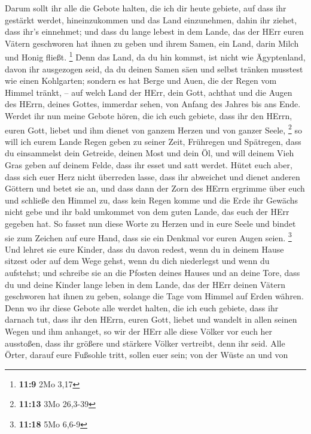  Darum sollt ihr alle die Gebote halten, die ich dir heute
gebiete, auf dass ihr gestärkt werdet, hineinzukommen und das Land
einzunehmen, dahin ihr ziehet, dass ihr's einnehmet;  und
dass du lange lebest in dem Lande, das der HErr euren Vätern geschworen
hat ihnen zu geben und ihrem Samen, ein Land, darin Milch und Honig
fließt. \footnote{\textbf{11:9} 2Mo 3,17}  Denn das Land,
da du hin kommst, ist nicht wie Ägyptenland, davon ihr ausgezogen seid,
da du deinen Samen säen und selbst tränken musstest wie einen
Kohlgarten;  sondern es hat Berge und Auen, die der Regen
vom Himmel tränkt, --  auf welch Land der HErr, dein Gott,
achthat und die Augen des HErrn, deines Gottes, immerdar sehen, von
Anfang des Jahres bis ans Ende.  Werdet ihr nun meine
Gebote hören, die ich euch gebiete, dass ihr den HErrn, euren Gott,
liebet und ihm dienet von ganzem Herzen und von ganzer Seele,
\footnote{\textbf{11:13} 3Mo 26,3-39}  so will ich eurem
Lande Regen geben zu seiner Zeit, Frühregen und Spätregen, dass du
einsammelst dein Getreide, deinen Most und dein Öl,  und
will deinem Vieh Gras geben auf deinem Felde, dass ihr esset und satt
werdet.  Hütet euch aber, dass sich euer Herz nicht
überreden lasse, dass ihr abweichet und dienet anderen Göttern und betet
sie an,  und dass dann der Zorn des HErrn ergrimme über
euch und schließe den Himmel zu, dass kein Regen komme und die Erde ihr
Gewächs nicht gebe und ihr bald umkommet von dem guten Lande, das euch
der HErr gegeben hat.  So fasset nun diese Worte zu Herzen
und in eure Seele und bindet sie zum Zeichen auf eure Hand, dass sie ein
Denkmal vor euren Augen seien. \footnote{\textbf{11:18} 5Mo 6,6-9}
 Und lehret sie eure Kinder, dass du davon redest, wenn du
in deinem Hause sitzest oder auf dem Wege gehst, wenn du dich
niederlegst und wenn du aufstehst;  und schreibe sie an die
Pfosten deines Hauses und an deine Tore,  dass du und deine
Kinder lange leben in dem Lande, das der HErr deinen Vätern geschworen
hat ihnen zu geben, solange die Tage vom Himmel auf Erden währen.
 Denn wo ihr diese Gebote alle werdet halten, die ich euch
gebiete, dass ihr darnach tut, dass ihr den HErrn, euren Gott, liebet
und wandelt in allen seinen Wegen und ihm anhanget,  so wir
der HErr alle diese Völker vor euch her ausstoßen, dass ihr größere und
stärkere Völker vertreibt, denn ihr seid.  Alle Örter,
darauf eure Fußsohle tritt, sollen euer sein; von der Wüste an und von
